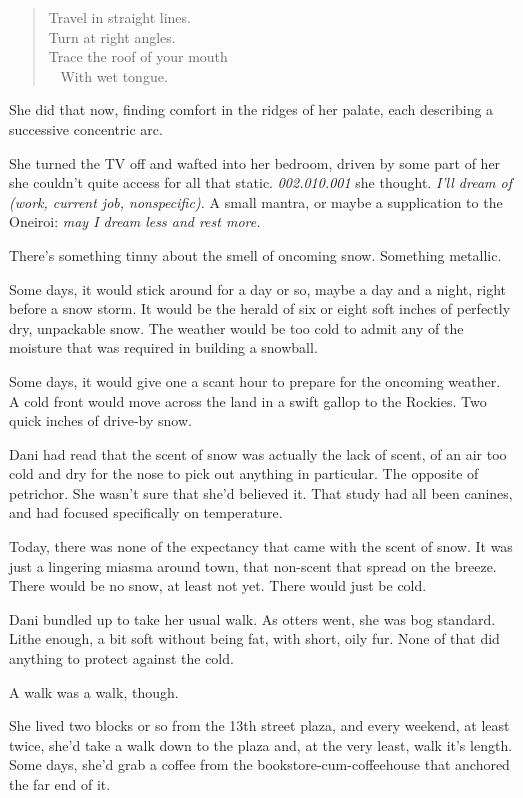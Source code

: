 \begin{quote}
Travel in straight lines.\\
Turn at right angles.\\
Trace the roof of your mouth\\
\hspace*{0.333em} ~ With wet tongue.
\end{quote}

She did that now, finding comfort in the ridges of her palate, each describing a successive concentric arc.

She turned the TV off and wafted into her bedroom, driven by some part of her she couldn't quite access for all that static. \emph{002.010.001} she thought. \emph{I'll dream of (work, current job, nonspecific).} A small mantra, or maybe a supplication to the Oneiroi: \emph{may I dream less and rest more.}

\secdiv

There's something tinny about the smell of oncoming snow. Something metallic.

Some days, it would stick around for a day or so, maybe a day and a night, right before a snow storm. It would be the herald of six or eight soft inches of perfectly dry, unpackable snow. The weather would be too cold to admit any of the moisture that was required in building a snowball.

Some days, it would give one a scant hour to prepare for the oncoming weather. A cold front would move across the land in a swift gallop to the Rockies. Two quick inches of drive-by snow.

Dani had read that the scent of snow was actually the lack of scent, of an air too cold and dry for the nose to pick out anything in particular. The opposite of petrichor. She wasn't sure that she'd believed it. That study had all been canines, and had focused specifically on temperature.

Today, there was none of the expectancy that came with the scent of snow. It was just a lingering miasma around town, that non-scent that spread on the breeze. There would be no snow, at least not yet. There would just be cold.

Dani bundled up to take her usual walk. As otters went, she was bog standard. Lithe enough, a bit soft without being fat, with short, oily fur. None of that did anything to protect against the cold.

A walk was a walk, though.

She lived two blocks or so from the 13th street plaza, and every weekend, at least twice, she'd take a walk down to the plaza and, at the very least, walk it's length. Some days, she'd grab a coffee from the bookstore-cum-coffeehouse that anchored the far end of it.


